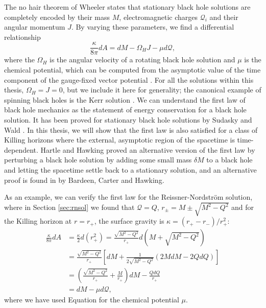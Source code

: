 The no hair theorem of Wheeler \cite{Misner:1974qy, Israel:1967wq} states that stationary black hole solutions are completely encoded by their mass $M$, electromagnetic charges $\mathcal{Q}_i$ and their angular momentum $J$. By varying these parameters, we find a differential relationship
\begin{equation}
\label{eq:firstlaw}
	\frac{\kappa}{8 \pi} dA  = dM - \Omega_H J - \mu d\mathcal{Q},
\end{equation}
where the $\Omega_H$ is the angular velocity of a rotating black hole solution and $\mu$ is the chemical potential, which can be computed from the asymptotic value of the time component of the gauge-fixed vector potential \cite{Hartnoll:2009sz}. For all the solutions within this thesis, $\Omega_H = J = 0$, but we include it here for generality; the canonical example of spinning black holes is the Kerr solution \cite{Kerr:1963ud}. We can understand the first law of black hole mechanics as the statement of energy conservation for a black hole solution. It has been proved for stationary black hole solutions by Sudasky and Wald \cite{Sudarsky:1992ty}. In this thesis, we will show that the first law is also satisfied for a class of Killing horizons where the external, asymptotic region of the spacetime is time-dependent. Hartle and Hawking \cite{Hawking:1972hy} proved an alternative version of the first law by perturbing a black hole solution by adding some small mass $\delta M$ to a black hole and letting the spacetime settle back to a stationary solution, and an alternative proof is found in \cite{Bardeen:1973gs} by Bardeen, Carter and Hawking.

As an example, we can verify the first law for the Reissner-Nordstr\"om solution, where in Section \ref{sec:rnsol} we found that $\mathcal{Q} = Q$, $r_\pm = M \pm \sqrt{M^2 - Q^2}$ and for the Killing horizon at $r = r_+$, the surface gravity is $\kappa = (r_+ - r_-) / r_+^2$:
\begin{equation*}
\begin{aligned}
	\frac{\kappa}{8 \pi} d A &= \frac{\kappa}{2} d (r_+^2) = \frac{\sqrt{M^2 - Q^2}}{r_+} d \left(M + \sqrt{M^2 - Q^2} \right)  \\
	&= \frac{\sqrt{M^2 - Q^2}}{r_+} \left[dM + \frac{1}{2\sqrt{M^2 - Q^2}} \left( 2MdM - 2QdQ \right) \right] \\
	&= \left(\frac{\sqrt{M^2 - Q^2}}{r_+} + \frac{M}{r_+} \right) dM - \frac{Q dQ}{r_+} \\
	&= dM - \mu d\mathcal{Q},
\end{aligned}
\end{equation*}
where we have used Equation  for the chemical potential $\mu$.

